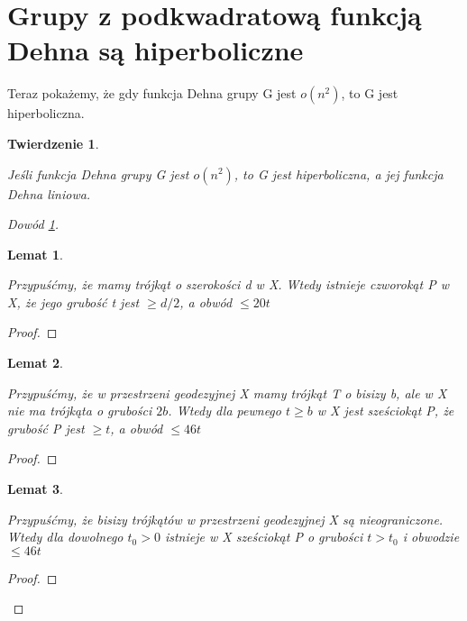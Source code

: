 \documentclass[licencjacka]{pracamgr}
\newtheorem{ther}{Twierdzenie}[section]
\newtheorem{lemma}{Lemat}[section]
\begin{document}
\section{Grupy z podkwadratową funkcją Dehna są hiperboliczne}

Teraz pokażemy, że gdy funkcja Dehna grupy G jest $o(n^2)$, to G jest hiperboliczna.

\begin{ther}\label{thm:subquadratic_hyperbolic}

Jeśli funkcja Dehna grupy G jest $o(n^2)$, to G jest hiperboliczna, a jej funkcja Dehna liniowa.

\end{ther}

\begin{proof}[Dowód \ref{thm:subquadratic_hyperbolic}]

\begin{lemma}\label{lemma:olshanskii_1}

Przypuśćmy, że mamy trójkąt o szerokości d w X. Wtedy istnieje czworokąt P w X, że jego grubość t jest $\geq d/2$, a obwód $\leq 20t$

\end{lemma}

\begin{proof}

\end{proof}

\begin{lemma}\label{lemma:olshanskii_2}

Przypuśćmy, że w przestrzeni geodezyjnej X mamy trójkąt T o bisizy b, ale w X nie ma trójkąta o grubości $2b$. Wtedy dla pewnego $t \geq b$ w X jest sześciokąt P, że grubość P jest $\geq t$, a obwód $\leq 46t$

\end{lemma}

\begin{proof}


\end{proof}

\begin{lemma}\label{lemma:olshanskii_3}

Przypuśćmy, że bisizy trójkątów w przestrzeni geodezyjnej X są nieograniczone. Wtedy dla dowolnego $t_{0} > 0$ istnieje w X sześciokąt P o grubości $t > t_{0}$ i obwodzie $\leq 46t$

\end{lemma}

\begin{proof}


\end{proof}
\end{proof}
\end{document}
